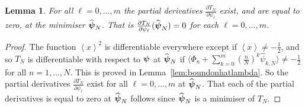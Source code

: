 \documentclass[aap,preprint]{imsart}
\newcommand{\fracpart}[1]{\left\langle #1 \right\rangle}
\newcommand{\sfracpart}[1]{\langle #1 \rangle}
\newtheorem{lemma}{Lemma}
\begin{document}
\begin{lemma}\label{lem:diffathatpsi}
For all $\ell = 0, \dots, m$ the partial derivatives $\frac{\partial T_N}{\partial \psi_\ell}$ exist, and are equal to zero, at the minimiser $\widehat{\boldsymbol{\psi}}_N$.  That is $\frac{\partial T_N}{\partial \psi_\ell}(\widehat{\boldsymbol{\psi}}_N) = 0$ for each $\ell = 0, \dots, m$.
\end{lemma}
\begin{proof}
The function $\fracpart{x}^2$ is differentiable everywhere except if $\fracpart{x} \neq -\frac{1}{2}$, and so $T_N$ is differentiable with respect to $\boldsymbol{\psi}$ at $\widehat{\boldsymbol{\psi}}_N$ if $\sfracpart{\Phi_n + \sum_{k=0}^m (\tfrac{n}{N})^k \widehat{\psi}_{k,N}} \neq -\tfrac{1}{2}$ for all $n = 1, \dots, N$.
This is proved in Lemma~\ref{lem:boundonhatlambda}.  So the partial derivatives $\frac{\partial T_N}{\partial \psi_\ell}$ exist for all $\ell = 0, \dots, m$ at $\widehat{\boldsymbol{\psi}}_N$.  That each of the partial derivatives is equal to zero at $\widehat{\boldsymbol{\psi}}_N$ follows since $\widehat{\boldsymbol{\psi}}_N$ is a minimiser of $T_N$.
\end{proof}
\end{document}
